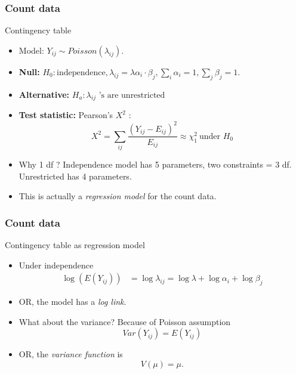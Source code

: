 \documentclass[handout]{beamer}
\begin{document}
   \begin{frame} \frametitle{Count data}

   \begin{block}
       {Contingency table}

       \begin{itemize}
       \item     Model: $Y_{ij} \sim  Poisson(\lambda_{ij} )$.


       \item {\bf Null:}
       $H_0 : \text{independence}, \lambda_{ij} = \lambda \alpha_i \cdot \beta_j , \sum_i \alpha_i = 1,  \sum_j \beta_j = 1.$

     \item {\bf
       Alternative:} $H_a : \text{$\lambda_{ij}$ 's are unrestricted}$

   \item {\bf    Test statistic:} Pearson's $X^2$ :
   $$
   X^2 = \sum_{ij} \frac{(Y_{ij}-E_{ij})^2}{E_{ij}} \approx \chi^2_1 \  \text{under $H_0$}$$

   \item
       Why 1 df ? Independence model has 5 parameters, two
       constraints = 3 df. Unrestricted has 4 parameters.

     \item This is actually a {\em regression model} for the count data.

       \end{itemize}

   \end{block}
   \end{frame}


   \begin{frame} \frametitle{Count data}

   \begin{block}
   {Contingency table as regression model}
   \begin{itemize}
   \item     Under independence
   $$
   \begin{aligned}
     \log(E (Y_{ij} )) &= \log \lambda_{ij} = \log \lambda  + \log \alpha_i + \log \beta_j
   \end{aligned}
   $$

   \item     OR, the model has a {\em log link}.

   \item     What about the variance? Because of Poisson assumption
          $$                  Var(Y_{ij} ) = E (Y_{ij})$$

        \item     OR, the {\em variance function} is
                             $$V (\mu) = \mu.$$
   \end{itemize}
   \end{block}
   \end{frame}
\end{document}
